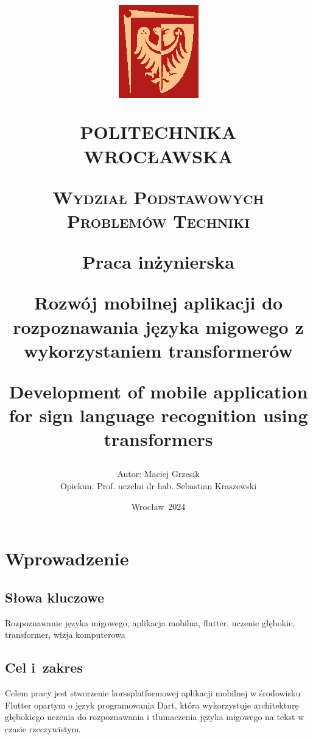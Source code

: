 \documentclass[12pt,a4paper,twoside]{book}
\title
    {
    \vspace{-2.5cm}
        {\includegraphics[width=.215\textwidth]{figs/PWrLogo.eps}} \par \vspace{1ex} \large{POLITECHNIKA WROCŁAWSKA} 
	\par \vspace{1ex}
	{\scshape\large Wydział Podstawowych Problemów Techniki\par}
	\vspace{2cm}
    {Praca inżynierska\par}  %
    \vspace{2cm}
	{\Large{\bf Rozwój mobilnej aplikacji do rozpoznawania języka migowego z wykorzystaniem transformerów}\par}
    {Development of mobile application for sign language recognition using transformers}
    }
\author
    {
    \vspace{1cm}
    Autor: Maciej Grzesik\\
    Opiekun: Prof. uczelni dr hab. Sebastian Kraszewski 
    }
\date{\vfill Wrocław~2024}
\begin{document}
\maketitle

{
  \hypersetup{linkcolor=black}
  \tableofcontents
}


\chapter{Wprowadzenie}\label{ch:intro}

\section{Słowa kluczowe}\label{sec:keywords}
Rozpoznawanie języka migowego, aplikacja mobilna, flutter, uczenie głębokie, transformer, wizja komputerowa

\section{Cel i~zakres}\label{sec:aimNscope}

Celem pracy jest stworzenie korssplatformowej aplikacji mobilnej w środowisku Flutter opartym o język programowania Dart, która wykorzystuje architekturę głębokiego uczenia do rozpoznawania i tłumaczenia języka migowego na tekst w czasie rzeczywistym. 
\end{document}
